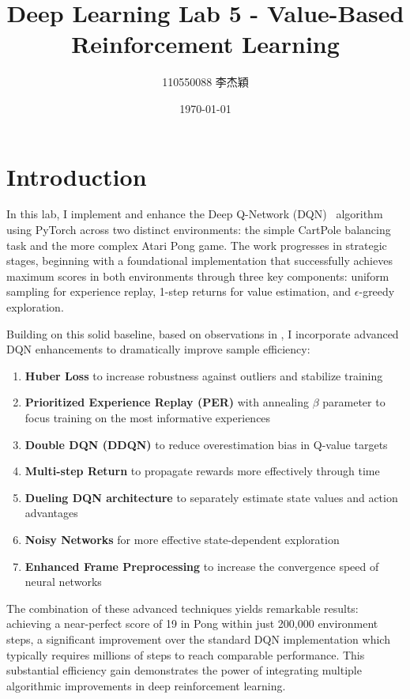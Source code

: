 \documentclass[a4paper]{article}
\title{Deep Learning Lab 5 - Value-Based Reinforcement Learning}
\author{110550088 李杰穎}
\date{\today}
\begin{document}
\maketitle
\section{Introduction}

In this lab, I implement and enhance the Deep Q-Network (DQN)~\cite{mnih2013playing} algorithm using PyTorch across two distinct environments: the simple CartPole balancing task and the more complex Atari Pong game. The work progresses in strategic stages, beginning with a foundational implementation that successfully achieves maximum scores in both environments through three key components: uniform sampling for experience replay, 1-step returns for value estimation, and $\epsilon$-greedy exploration.

Building on this solid baseline, based on observations in \cite{hessel2018rainbow}, I incorporate advanced DQN enhancements to dramatically improve sample efficiency:

\begin{enumerate}
    \item \textbf{Huber Loss} to increase robustness against outliers and stabilize training
    \item \textbf{Prioritized Experience Replay (PER)} with annealing $\beta$ parameter to focus training on the most informative experiences
    \item \textbf{Double DQN (DDQN)} to reduce overestimation bias in Q-value targets
    \item \textbf{Multi-step Return} to propagate rewards more effectively through time
    \item \textbf{Dueling DQN architecture} to separately estimate state values and action advantages
    \item \textbf{Noisy Networks} for more effective state-dependent exploration
    \item \textbf{Enhanced Frame Preprocessing} to increase the convergence speed of neural networks
\end{enumerate}

The combination of these advanced techniques yields remarkable results: achieving a near-perfect score of 19 in Pong within just 200,000 environment steps, a significant improvement over the standard DQN implementation which typically requires millions of steps to reach comparable performance. This substantial efficiency gain demonstrates the power of integrating multiple algorithmic improvements in deep reinforcement learning.
\end{document}
